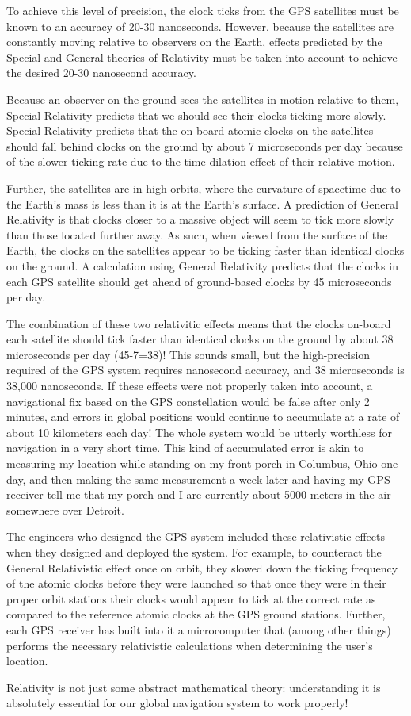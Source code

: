 To achieve this level of precision, the clock ticks from the GPS satellites must be known to an accuracy of 20-30 nanoseconds. However, because the satellites are constantly moving relative to observers on the Earth, effects predicted by the Special and General theories of Relativity must be taken into account to achieve the desired 20-30 nanosecond accuracy. 

Because an observer on the ground sees the satellites in motion relative to them, Special Relativity predicts that we should see their clocks ticking more slowly. Special Relativity predicts that the on-board atomic clocks on the satellites should fall behind clocks on the ground by about 7 microseconds per day because of the slower ticking rate due to the time dilation effect of their relative motion. 

Further, the satellites are in high orbits, where the curvature of spacetime due to the Earth's mass is less than it is at the Earth's surface. A prediction of General Relativity is that clocks closer to a massive object will seem to tick more slowly than those located further away. As such, when viewed from the surface of the Earth, the clocks on the satellites appear to be ticking faster than identical clocks on the ground. A calculation using General Relativity predicts that the clocks in each GPS satellite should get ahead of ground-based clocks by 45 microseconds per day. 

The combination of these two relativitic effects means that the clocks on-board each satellite should tick faster than identical clocks on the ground by about 38 microseconds per day (45-7=38)! This sounds small, but the high-precision required of the GPS system requires nanosecond accuracy, and 38 microseconds is 38,000 nanoseconds. If these effects were not properly taken into account, a navigational fix based on the GPS constellation would be false after only 2 minutes, and errors in global positions would continue to accumulate at a rate of about 10 kilometers each day! The whole system would be utterly worthless for navigation in a very short time. This kind of accumulated error is akin to measuring my location while standing on my front porch in Columbus, Ohio one day, and then making the same measurement a week later and having my GPS receiver tell me that my porch and I are currently about 5000 meters in the air somewhere over Detroit. 

The engineers who designed the GPS system included these relativistic effects when they designed and deployed the system. For example, to counteract the General Relativistic effect once on orbit, they slowed down the ticking frequency of the atomic clocks before they were launched so that once they were in their proper orbit stations their clocks would appear to tick at the correct rate as compared to the reference atomic clocks at the GPS ground stations. Further, each GPS receiver has built into it a microcomputer that (among other things) performs the necessary relativistic calculations when determining the user's location. 

Relativity is not just some abstract mathematical theory: understanding it is absolutely essential for our global navigation system to work properly! 

